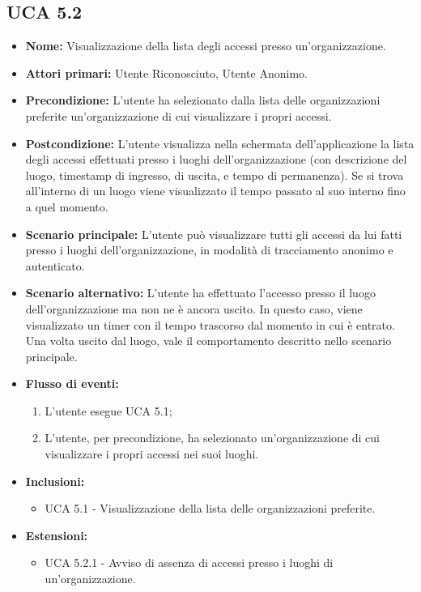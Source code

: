 \subsection{UCA 5.2}
\begin{itemize}
    \item \textbf{Nome:} Visualizzazione della lista degli accessi presso un'organizzazione.
    \item \textbf{Attori primari:} Utente Riconosciuto, Utente Anonimo.
    \item \textbf{Precondizione:} L'utente ha selezionato dalla lista delle organizzazioni preferite un'organizzazione di cui visualizzare i propri accessi.
    \item \textbf{Postcondizione:} L’utente visualizza nella schermata dell’applicazione la lista degli accessi effettuati presso i luoghi dell’organizzazione (con descrizione del luogo, timestamp di ingresso, di uscita, e tempo di permanenza).
    Se si trova all'interno di un luogo viene visualizzato il tempo passato al suo interno fino a quel momento.
    \item \textbf{Scenario principale:} L'utente può visualizzare tutti gli accessi da lui fatti presso i luoghi dell'organizzazione, in modalità di tracciamento anonimo e autenticato.
    \item \textbf{Scenario alternativo:} L'utente ha effettuato l'accesso presso il luogo dell'organizzazione ma non ne è ancora uscito. In questo caso, viene visualizzato un timer con il tempo trascorso dal momento in cui è entrato.
    Una volta uscito dal luogo, vale il comportamento descritto nello scenario principale. 
    \item \textbf{Flusso di eventi:}
    \begin{enumerate}
        \item L'utente esegue UCA 5.1;
        \item L'utente, per precondizione, ha selezionato un'organizzazione di cui visualizzare i propri accessi nei suoi luoghi.
    \end{enumerate}
    \item \textbf{Inclusioni:} %
    \begin{itemize}
        \item UCA 5.1 - Visualizzazione della lista delle organizzazioni preferite.
    \end{itemize}
    \item \textbf{Estensioni:}
    \begin{itemize}
        \item UCA 5.2.1 - Avviso di assenza di accessi presso i luoghi di un’organizzazione.
    \end{itemize}
\end{itemize}

